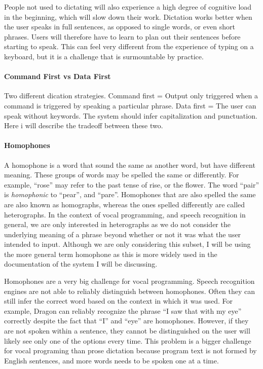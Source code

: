 \documentclass[../thesis.tex]{subfiles}
\begin{document}
People not used to dictating will also experience a high degree of cognitive load in the beginning, which will slow down their work.
Dictation works better when the user speaks in full sentences, as opposed to single words, or even short phrases.
Users will therefore have to learn to plan out their sentences before starting to speak.
This can feel very different from the experience of typing on a keyboard, but it is a challenge that is surmountable by practice.

\paragraph{Command First vs Data First}
Two different dication strategies.
Command first = Output only triggered when a command is triggered by speaking a particular phrase.
Data first = The user can speak without keywords. The system should infer capitalization and punctuation.
Here i will describe the tradeoff between these two.

\paragraph{Homophones}
A homophone is a word that sound the same as another word, but have different meaning.
These groups of words may be spelled the same or differently.
For example, ``rose'' may refer to the past tense of rise, or the flower.
The word ``pair'' is \textit{homophonic} to ``pear'', and ``pare''.
Homophones that are also spelled the same are also known as homographs, whereas the ones spelled differently are called heterographs.
In the context of vocal programming, and speech recognition in general, we are only interested in heterographs as we do not consider
the underlying meaning of a phrase beyond whether or not it was what the user intended to input.
Although we are only considering this subset, I will be using the more general term homophone as this is more widely used in the documentation
of the system I will be discussing.

Homophones are a very big challenge for vocal programming.
Speech recognition engines are not able to reliably distinguish between homophones.
Often they can still infer the correct word based on the context in which it was used.
For example, Dragon can reliably recognize the phrase ``I saw that with my eye'' correctly despite the fact that ``I'' and ``eye'' are homophones.
However, if they are not spoken within a sentence, they cannot be distinguished on the user will likely see only one of the options every time.
This problem is a bigger challenge for vocal programing than prose dictation because program text is not formed by English sentences, and more words needs to be
spoken one at a time.
\end{document}
